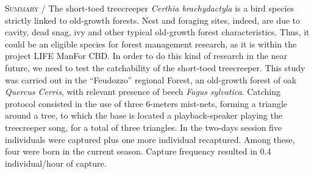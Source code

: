 {\small
\noindent \textsc{\color{MUSEBLUE} Summary} / The short-toed treecreeper \textit{Certhia brachydactyla} is a bird
species strictly linked to old-growth forests. Nest and foraging sites,
indeed, are due to cavity, dead snag, ivy and other typical old-growth
forest characteristics. Thus, it could be an eligible species for
forest management research, as it is within the project LIFE ManFor
CBD. In order to do this kind of research in the near future, we need
to test the catchability of the short-toed treecreeper. This study was
carried out in the {\textquotedblleft}Feudozzo{\textquotedblright}
regional Forest, an old-growth forest of oak \textit{Quercus Cerris},
with relevant presence of beech \textit{Fagus sylvatica}. Catching
protocol consisted in the use of three 6-meters mist-nets, forming a
triangle around a tree, to which the base is located a playback-speaker
playing the treecreeper song, for a total of three triangles. In the
two-days session five individuals were captured plus one more
individual recaptured. Among these, four were born in the current
season. Capture frequency resulted in 0.4 individual/hour of capture.
}


